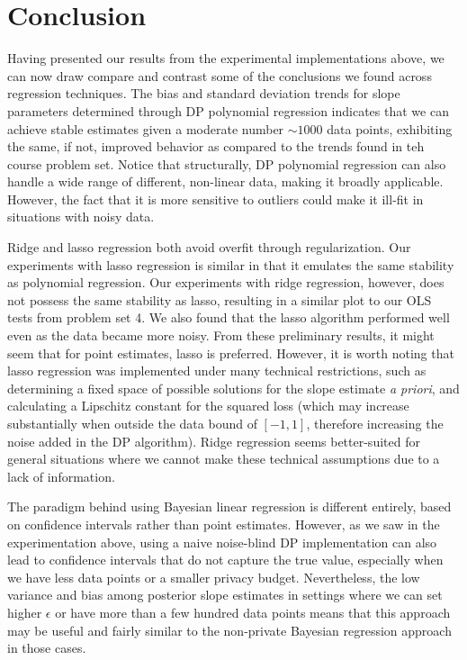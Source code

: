 \documentclass[11pt,conference]{IEEEtran}
\begin{document}
\section{Conclusion}
\color{brown}
Having presented our results from the experimental implementations above, we can now draw compare and contrast some of the conclusions we found across regression techniques. The bias and standard deviation trends for slope parameters determined through DP polynomial regression indicates that we can achieve stable estimates given a moderate number $\sim 1000$ data points, exhibiting the same, if not, improved behavior as compared to the trends found in teh course problem set. Notice that structurally, DP polynomial regression can also handle a wide range of different, non-linear data, making it broadly applicable. However, the fact that it is more sensitive to outliers could make it ill-fit in situations with noisy data.

Ridge and lasso regression both avoid overfit through regularization. Our experiments with lasso regression is similar in that it emulates the same stability as polynomial regression. Our experiments with ridge regression, however, does not possess the same stability as lasso, resulting in a similar plot to our OLS tests from problem set 4. We also found that the lasso algorithm performed well even as the data became more noisy. From these preliminary results, it might seem that for point estimates, lasso is preferred. However, it is worth noting that lasso regression was implemented under many technical restrictions, such as determining a fixed space of possible solutions for the slope estimate \textit{a priori}, and calculating a Lipschitz constant for the squared loss (which may increase substantially when outside the data bound of $[-1, 1]$, therefore increasing the noise added in the DP algorithm). Ridge regression seems better-suited for general situations where we cannot make these technical assumptions due to a lack of information.

The paradigm behind using Bayesian linear regression is different entirely, based on confidence intervals rather than point estimates. However, as we saw in the experimentation above, using a naive noise-blind DP implementation can also lead to confidence intervals that do not capture the true value, especially when we have less data points or a smaller privacy budget. Nevertheless, the low variance and bias among posterior slope estimates in settings where we can set higher $\epsilon$ or have more than a few hundred data points means that this approach may be useful and fairly similar to the non-private Bayesian regression approach in those cases.
\end{document}

